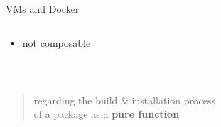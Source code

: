 \documentclass{beamer}
\begin{document}
\begin{frame}{VMs and Docker}
{\begin{columns}
\begin{column}[t]
\begin{itemize}

      \item not composable
      \end{itemize}
    \end{column}
  \end{columns}
  }
\end{frame}

\begin{frame}[plain]
  \\[2em]
  \begin{quote}
    \large{
    regarding the build \& installation process\\
    of a package as a \textbf{pure function}}
  \end{quote}
\end{frame}

\end{document}
